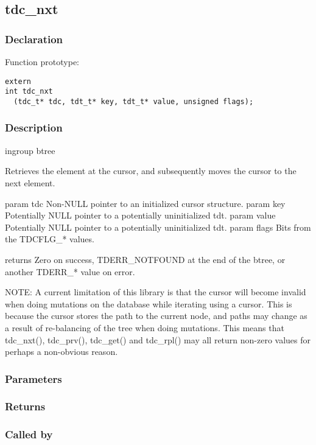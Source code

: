 
\newpage
\subsection{tdc\_nxt}
\subsubsection{Declaration} Function prototype:

\begin{verbatim}
extern
int tdc_nxt
  (tdc_t* tdc, tdt_t* key, tdt_t* value, unsigned flags);
\end{verbatim}

\subsubsection{Description}


 ingroup btree

 Retrieves the element at the cursor, and subsequently moves the cursor
 to the next element.

 param tdc Non-NULL pointer to an initialized cursor structure.
 param key Potentially NULL pointer to a potentially uninitialized tdt.
 param value Potentially NULL pointer to a potentially uninitialized tdt.
 param flags Bits from the TDCFLG\_* values.

 returns Zero on success, TDERR\_NOTFOUND at the end of the btree,
 or another TDERR\_* value on error.

 NOTE: A current limitation of this library is that the cursor will
 become invalid when doing mutations on the database while iterating
 using a cursor. This is because the cursor stores the path to the
 current node, and paths may change as a result of re-balancing of
 the tree when doing mutations. This means that tdc\_nxt(), tdc\_prv(),
 tdc\_get() and tdc\_rpl() may all return non-zero values for perhaps
 a non-obvious reason.

 

\subsubsection{Parameters}
\subsubsection{Returns}
\subsubsection{Called by}
